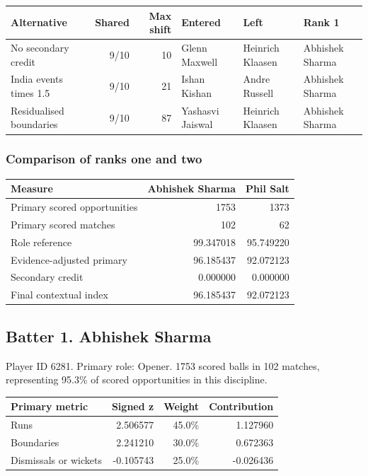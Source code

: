 \begin{center}
\begin{tabularx}{\linewidth}{>{\raggedright\arraybackslash}Xrr>{\raggedright\arraybackslash}X>{\raggedright\arraybackslash}X>{\raggedright\arraybackslash}X}
\toprule
Alternative & Shared & Max shift & Entered & Left & Rank 1 \\
\midrule
No secondary credit & 9/10 & 10 & Glenn Maxwell & Heinrich Klaasen & Abhishek Sharma \\
India events times 1.5 & 9/10 & 21 & Ishan Kishan & Andre Russell & Abhishek Sharma \\
Residualised boundaries & 9/10 & 87 & Yashasvi Jaiswal & Heinrich Klaasen & Abhishek Sharma \\
\bottomrule
\end{tabularx}
\end{center}

\subsubsection*{Comparison of ranks one and two}

\begin{center}
\begin{tabularx}{\linewidth}{>{\raggedright\arraybackslash}Xrr}
\toprule
Measure & Abhishek Sharma & Phil Salt \\
\midrule
Primary scored opportunities & 1753 & 1373 \\
Primary scored matches & 102 & 62 \\
Role reference & 99.347018 & 95.749220 \\
Evidence-adjusted primary & 96.185437 & 92.072123 \\
Secondary credit & 0.000000 & 0.000000 \\
Final contextual index & 96.185437 & 92.072123 \\
\bottomrule
\end{tabularx}
\end{center}

\clearpage

\subsection{Batter 1. Abhishek Sharma}

Player ID 6281. Primary role: Opener. 1753 scored balls in 102 matches, representing 95.3\% of scored opportunities in this discipline.

\begin{center}
\begin{tabularx}{\linewidth}{>{\raggedright\arraybackslash}Xrrr}
\toprule
Primary metric & Signed z & Weight & Contribution \\
\midrule
Runs & 2.506577 & 45.0\% & 1.127960 \\
Boundaries & 2.241210 & 30.0\% & 0.672363 \\
Dismissals or wickets & -0.105743 & 25.0\% & -0.026436 \\
\bottomrule
\end{tabularx}
\end{center}

